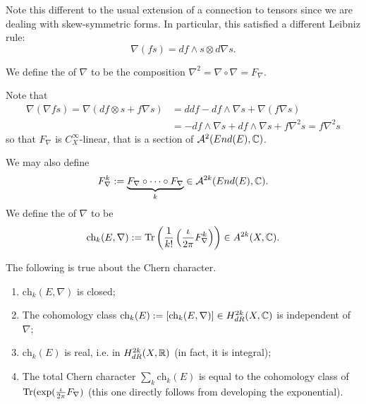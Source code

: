 \begin{remark}
	Note this different to the usual extension of a connection to tensors since we are dealing with skew-symmetric forms. In particular, this satisfied a different Leibniz rule:
	\[
	\nabla(fs)=df\wedge s\otimes d\nabla s.
	\]
\end{remark}

\begin{definition}
	We define the  of $\nabla$ to be the composition $\nabla^2=\nabla\circ\nabla=F_\nabla$.
\end{definition}

Note that
\begin{align*}
	\nabla(\nabla fs)=\nabla(df\otimes s+f\nabla s)&=ddf-df\wedge\nabla s+\nabla(f\nabla s)	\\
	&=-df\wedge\nabla s+df\wedge\nabla s+f\nabla^2s=f\nabla^2s
\end{align*}
so that $F_\nabla$ is $C^\infty_X$-linear, that is a section of $\mathcal{A}^2(End(E),\mathbb C)$.

We may also define
%
\[F_\nabla^k:=\underbrace{F_\nabla\circ\cdots\circ F_\nabla}_k\in \mathcal{A}^{2k}(End(E),\mathbb C).
\]
We define the  of $\nabla$ to be
%
\[
\text{ch}_k(E,\nabla):= \text{Tr}\left(\frac{1}{k!}\left(\frac{\iota}{2\pi}F_\nabla^k\right)\right)\in A^{2k}(X,\mathbb C).
\]

\begin{theorem}
	The following is true about the Chern character.
	\begin{enumerate}
		\item $\text{ch}_k(E,\nabla)$ is closed;
		\item The cohomology class $\text{ch}_k(E):=[\text{ch}_k(E,\nabla)]\in H^{2k}_{dR}(X,\mathbb C)$ is independent of $\nabla$;
		\item $\text{ch}_k(E)$ is real, i.e. in $H^{2k}_{dR}(X,\mathbb R)$ (in fact, it is integral);
		\item The total Chern character $\sum_k\text{ch}_k(E)$ is equal to the cohomology class of $\text{Tr}(\exp(\frac{\iota}{2\pi}F_\nabla)$ (this one directly follows from developing the exponential).
	\end{enumerate}	
\end{theorem}